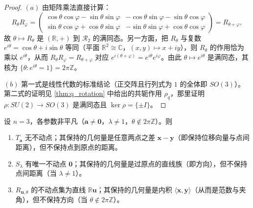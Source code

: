 \begin{proof}
$(a)$ 由矩阵乘法直接计算：
\[
R_\theta R_\varphi =
\begin{pmatrix}
\cos\theta\cos\varphi - \sin\theta\sin\varphi & -\cos\theta\sin\varphi - \sin\theta\cos\varphi \\
\sin\theta\cos\varphi + \cos\theta\sin\varphi & -\sin\theta\sin\varphi + \cos\theta\cos\varphi
\end{pmatrix}
= R_{\theta+\varphi},
\]
故 $\theta \mapsto R_\theta$ 是 $(\mathbb R,+)$ 到 $\mathcal R_2$ 的满同态。另一方面，把 $R_\theta$ 与复数 $e^{i\theta}=\cos\theta+i\sin\theta$ 等同（平面 $\mathbb R^2 \cong \mathbb C$，$(x,y)\mapsto x+iy$），则 $R_\theta$ 的作用恰为乘以 $e^{i\theta}$，从而 $R_\theta R_\varphi = R_{\theta+\varphi}$ 对应 $e^{i(\theta+\varphi)} = e^{i\theta}e^{i\varphi}$。由此 $\theta\mapsto e^{i\theta}$ 是满同态，其核为 $\{\theta : e^{i\theta}=1\} = 2\pi\mathbb Z$。

$(b)$ 第一式是线性代数的标准结论（正交阵且行列式为 $1$ 的全体即 $SO(3)$）。第二式的证明见 \cref{thm:q_rotation} 中给出的共轭作用 $\rho_q$，那里证明 $\rho: SU(2)\to SO(3)$ 是满同态且 $\ker\rho = \{\pm I\}$。
\end{proof}

\begin{proposition}[三类变换的不动点与不变量]\label{prop:transform_invariants}
设 $n=3$，各参数非平凡（$\mathbf a \ne \mathbf 0$，$\lambda \ne 1$，$\theta \notin 2\pi\mathbb Z$）。则
\begin{enumerate}[label=(\roman*)]
    \item $T_{\mathbf a}$ 无不动点；其保持的几何量是任意两点之差 $\mathbf x - \mathbf y$（即保持位移向量与点间距离），但不保持点到原点的距离。
    \item $S_\lambda$ 有唯一不动点 $\mathbf{0}$；其保持的几何量是过原点的直线族（即方向），但不保持点间距离（当 $\lambda\ne1$）。
    \item $R_{\mathbf u,\theta}$ 的不动点集为直线 $\mathbb R\mathbf u$；其保持的几何量是内积 $\langle\mathbf x,\mathbf y\rangle$（从而是范数与夹角），但不保持方向（当 $\theta\notin 2\pi\mathbb Z$）。
\end{enumerate}
\end{proposition}

